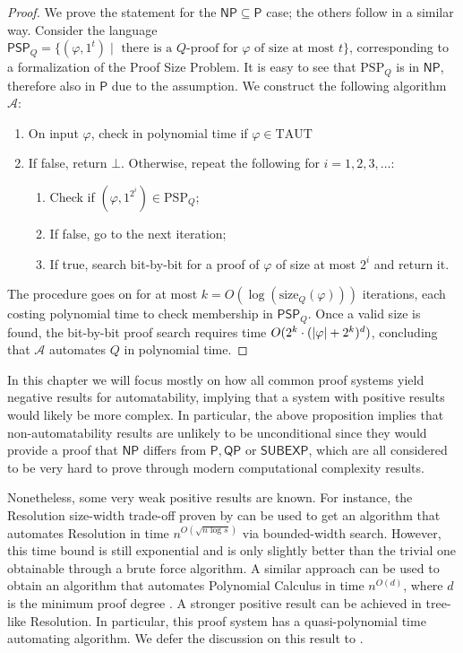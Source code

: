 \begin{proof}
    We prove the statement for the $\mathsf{NP} \subseteq \mathsf{P}$ case; the others follow in a similar way. Consider the language $\mathsf{PSP}_Q = \{(\varphi, 1^t) \mid \text{ there is a $Q$-proof for $\varphi$ of size at most $t$}\}$, corresponding to a formalization of the Proof Size Problem. It is easy to see that $\mathrm{PSP}_Q$ is in $\mathsf{NP}$, therefore also in $\mathsf{P}$ due to the assumption. We construct the following algorithm $\mathcal{A}$:
    \begin{enumerate}[nosep]
        \item On input $\varphi$, check in polynomial time if $\varphi \in \mathrm{TAUT}$
        \item If false, return $\bot$. Otherwise, repeat the following for $i = 1, 2, 3, \ldots$:
        \begin{enumerate}[label={\arabic*}, start=2]
            \item Check if $(\varphi, 1^{2^i}) \in \mathrm{PSP}_Q$;
            \item If false, go to the next iteration;
            \item If true, search bit-by-bit for a proof of $\varphi$ of size at most $2^i$ and return it.
        \end{enumerate}
    \end{enumerate}

    The procedure goes on for at most $k = O(\log(\mathrm{size}_Q(\varphi)))$ iterations, each costing polynomial time to check membership in $\mathsf{PSP}_Q$. Once a valid size is found, the bit-by-bit proof search requires time $O(2^k \cdot (\left|\varphi\right| + 2^k)^d)$, concluding that $\mathcal{A}$ automates $Q$ in polynomial time.
\end{proof}

In this chapter we will focus mostly on how all common proof systems yield negative results for automatability, implying that a system with positive results would likely be more complex. In particular, the above proposition implies that non-automatability results are unlikely to be unconditional since they would provide a proof that $\mathsf{NP}$ differs from $\mathsf{P}, \mathsf{QP}$ or $\mathsf{SUBEXP}$, which are all considered to be very hard to prove through modern computational complexity results. 

Nonetheless, some very weak positive results are known. For instance, the Resolution size-width trade-off proven by \textcite{bs_wigder} can be used to get an algorithm that automates Resolution in time $n^{O(\sqrt{n \log s})}$ via bounded-width search. However, this time bound is still exponential and is only slightly better than the trivial one obtainable through a brute force algorithm. A similar approach can be used to obtain an algorithm that automates Polynomial Calculus in time $n^{O(d)}$, where $d$ is the minimum proof degree \cite{separation_pc_ns,pc_wphard}. A stronger positive result can be achieved in tree-like Resolution. In particular, this proof system has a quasi-polynomial time automating algorithm. We defer the discussion on this result to .

